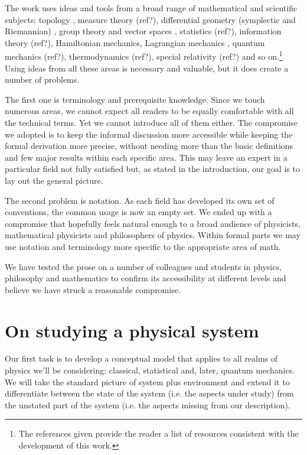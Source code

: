 \documentclass[smallextended]{svjour3}
\numberwithin{equation}{section}
\begin{document}
The work uses ideas and tools from a broad range of mathematical and scientific subjects: topology \cite{LeeTM}, measure theory (ref?), differential geometry (symplectic and Riemannian) \cite{Lee}, group theory and vector spaces \cite{Lang,Young}, statistics (ref?), information theory (ref?), Hamiltonian mechanics, Lagrangian mechanics \cite{classical_dynamics}, quantum mechanics (ref?), thermodynamics (ref?), special relativity (ref?) and so on.\footnote{The references given provide the reader a list of resources consistent with the development of this work.} Using ideas from all these areas is necessary and valuable, but it does create a number of problems.

The first one is terminology and prerequisite knowledge. Since we touch numerous areas, we cannot expect all readers to be equally comfortable with all the technical terms. Yet we cannot introduce all of them either. The compromise we adopted is to keep the informal discussion more accessible while keeping the formal derivation more precise, without needing more than the basic definitions and few major results within each specific area. This may leave an expert in a particular field not fully satisfied but, as stated in the introduction, our goal is to lay out the general picture.

The second problem is notation. As each field has developed its own set of conventions, the common usage is now an empty set. We ended up with a compromise that hopefully feels natural enough to a broad audience of physicists, mathematical physicists and philosophers of physics. Within formal parts we may use notation and terminology more specific to the appropriate area of math.

We have tested the prose on a number of colleagues and students in physics, philosophy and mathematics to confirm its accessibility at different levels and believe we have struck a reasonable compromise.

\section{On studying a physical system}
\label{sec:fundamental_model}


Our first task is to develop a conceptual model that applies to all realms of physics we'll be considering: classical, statistical and, later, quantum mechanics. We will take the standard picture of system plus environment and extend it to differentiate between the state of the system (i.e. the aspects under study) from the unstated part of the system (i.e. the aspects missing from our description).
\end{document}
